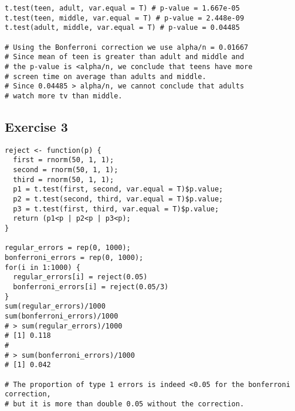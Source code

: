 \documentclass{article}
\begin{document}
\begin{lstlisting}
t.test(teen, adult, var.equal = T) # p-value = 1.667e-05
t.test(teen, middle, var.equal = T) # p-value = 2.448e-09
t.test(adult, middle, var.equal = T) # p-value = 0.04485

# Using the Bonferroni correction we use alpha/n = 0.01667
# Since mean of teen is greater than adult and middle and 
# the p-value is <alpha/n, we conclude that teens have more 
# screen time on average than adults and middle.
# Since 0.04485 > alpha/n, we cannot conclude that adults 
# watch more tv than middle.
\end{lstlisting}
\newpage 

\subsection*{Exercise 3}
\begin{lstlisting}
reject <- function(p) {
  first = rnorm(50, 1, 1);
  second = rnorm(50, 1, 1);
  third = rnorm(50, 1, 1);
  p1 = t.test(first, second, var.equal = T)$p.value;
  p2 = t.test(second, third, var.equal = T)$p.value; 
  p3 = t.test(first, third, var.equal = T)$p.value;
  return (p1<p | p2<p | p3<p);
}

regular_errors = rep(0, 1000);
bonferroni_errors = rep(0, 1000);
for(i in 1:1000) {
  regular_errors[i] = reject(0.05)
  bonferroni_errors[i] = reject(0.05/3)
}
sum(regular_errors)/1000
sum(bonferroni_errors)/1000
# > sum(regular_errors)/1000
# [1] 0.118
# 
# > sum(bonferroni_errors)/1000
# [1] 0.042

# The proportion of type 1 errors is indeed <0.05 for the bonferroni correction,
# but it is more than double 0.05 without the correction.
\end{lstlisting}
\end{document}
